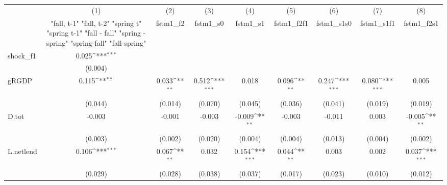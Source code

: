 {
\def\sym#1{\ifmmode^{#1}\else\(^{#1}\)\fi}
\begin{tabular}{l*{8}{c}}
\toprule
            &\multicolumn{1}{c}{(1)}&\multicolumn{1}{c}{(2)}&\multicolumn{1}{c}{(3)}&\multicolumn{1}{c}{(4)}&\multicolumn{1}{c}{(5)}&\multicolumn{1}{c}{(6)}&\multicolumn{1}{c}{(7)}&\multicolumn{1}{c}{(8)}\\
            &\multicolumn{1}{c}{  "fall, t-1" "fall, t-2" "spring t" "spring t-1"  "fall - fall" "spring - spring" "spring-fall" "fall-spring" }&\multicolumn{1}{c}{fstm1\_f2}&\multicolumn{1}{c}{fstm1\_s0}&\multicolumn{1}{c}{fstm1\_s1}&\multicolumn{1}{c}{fstm1\_f2f1}&\multicolumn{1}{c}{fstm1\_s1s0}&\multicolumn{1}{c}{fstm1\_s1f1}&\multicolumn{1}{c}{fstm1\_f2s1}\\
\midrule
shock\_f1    &       0.025\sym{***}&                     &                     &                     &                     &                     &                     &                     \\
            &     (0.004)         &                     &                     &                     &                     &                     &                     &                     \\
\addlinespace
gRGDP       &       0.115\sym{**} &       0.033\sym{**} &       0.512\sym{***}&       0.018         &       0.096\sym{**} &       0.247\sym{***}&       0.080\sym{***}&       0.005         \\
            &     (0.044)         &     (0.014)         &     (0.070)         &     (0.045)         &     (0.036)         &     (0.041)         &     (0.019)         &     (0.019)         \\
\addlinespace
D.tot       &      -0.003         &      -0.001         &      -0.003         &      -0.009\sym{**} &      -0.003         &      -0.011         &       0.003         &      -0.005\sym{**} \\
            &     (0.003)         &     (0.002)         &     (0.020)         &     (0.004)         &     (0.004)         &     (0.013)         &     (0.004)         &     (0.002)         \\
\addlinespace
L.netlend   &       0.106\sym{***}&       0.067\sym{**} &       0.032         &       0.154\sym{***}&       0.044\sym{**} &       0.003         &       0.002         &       0.037\sym{***}\\
            &     (0.029)         &     (0.028)         &     (0.038)         &     (0.037)         &     (0.017)         &     (0.023)         &     (0.010)         &     (0.012)         \\

\end{tabular}}

